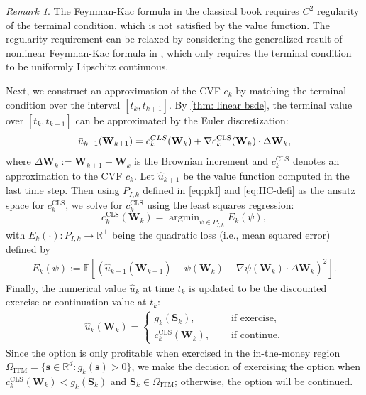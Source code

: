 \documentclass[10pt,a4paper]{amsart}
\numberwithin{equation}{section}
\numberwithin{algorithm}{section}
\theoremstyle{plain}
\theoremstyle{remark}
\newtheorem{remark}[remark]{Remark}
\DeclareMathOperator*{\argmin}{argmin}
\newcommand{\op}{\operatorname}
\newcommand{\R}{\mathbb{R}}
\begin{document}
\begin{remark}
The Feynman-Kac formula in the classical book \cite{oksendal2013stochastic} requires $C^2$ regularity of the terminal condition, which is not satisfied by the value function. The regularity requirement can be relaxed by considering the generalized result of nonlinear Feynman-Kac formula in \cite[p. 105]{zhang2017backward}, which only requires the terminal condition to be uniformly Lipschitz continuous.
\end{remark}

Next, we construct an approximation of the CVF ${c}_{k}$ by matching the terminal condition over the interval $[t_k,t_{k+1}]$. By \cref{thm: linear bsde}, the terminal value over $[t_k,t_{k+1}]$ can be approximated by the Euler discretization:
\begin{equation} \label{eq: approximation equation}
     \bar{u}_{k+1}(\mathbf{W}_{k+1}) =
     {c}^{{\rm CLS}}_{k}(\mathbf{W}_k) + \nabla {c}^{\op{CLS}}_{k}(\mathbf{W}_k) \cdot \Delta\mathbf{W}_k,
\end{equation}
where $\Delta\mathbf{W}_k:=\mathbf{W}_{k+1} - \mathbf{W}_k$ is the Brownian increment and ${c}^{\op{CLS}}_{k}$ denotes an approximation to the CVF ${c}_{k}$. Let $\hat{u}_{k+1}$ be the value function computed in the last time step. Then using $P_{I,k}$ defined in \cref{eq:pkI} and \cref{eq:HC-defi} as the ansatz space for ${c}^{\op{CLS}}_{k}$, we solve for ${c}^{\op{CLS}}_{k}$ using the least squares regression:
\begin{equation} \label{eq: expected risk}
    {c}_{k}^{\op{CLS}}(\mathbf{W}_k) = \argmin_{\psi \in P_{I,k}} E_k(\psi),
\end{equation}
with $E_k(\cdot): P_{I,k}\to \mathbb{R}^+$ being the quadratic loss (i.e., mean squared error) defined by
\begin{align*}
E_k(\psi):=\mathbb{E}\left[\left( \hat{u}_{k+1}(\mathbf{W}_{k+1}) - \psi(\mathbf{W}_k) - \nabla \psi(\mathbf{W}_k) \cdot \Delta \mathbf{W}_k \right)^2 \right].
\end{align*}
Finally, the numerical value $\hat{u}_k$ at time $t_k$ is updated to be the discounted exercise or continuation value at $t_k$:
\begin{align}\label{eq:num-val}
\hat{u}_{k}(\mathbf{W}_k)=\begin{cases}
    g_k(\mathbf{S}_k), \quad &\text{ if exercise}, \\
    c_k^{\op{CLS}}(\mathbf{W}_k), \quad &\text{ if continue}.
\end{cases}
\end{align}
Since the option is only profitable when exercised in the in-the-money region $\Omega_{\op{ITM}} = \{\mathbf{s}\in \R^d: g_k(\mathbf{s})>0\}$, we make the decision of exercising the option when $c_k^{\op{CLS}}(\mathbf{W}_k) < g_k(\mathbf{S}_k)$ and $\mathbf{S}_k \in \Omega_{\op{ITM}}$; otherwise, the option will be continued.
\end{document}
